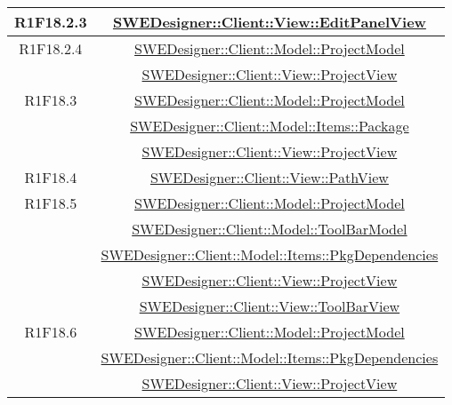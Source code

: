 \documentclass[../DefinizioneDiProdotto.tex]{subfiles}
\begin{document}
\begin{longtable}{|c|c|}
				R1F18.2.3
				& \hyperlink{SWEDesigner::Client::View::EditPanelView}{SWEDesigner::Client::View::EditPanelView}\\
				\hline

				R1F18.2.4
				& \hyperlink{SWEDesigner::Client::Model::ProjectModel}{SWEDesigner::Client::Model::ProjectModel}\\
				& \hyperlink{SWEDesigner::Client::View::ProjectView}{SWEDesigner::Client::View::ProjectView}\\
				\hline

				R1F18.3
				& \hyperlink{SWEDesigner::Client::Model::ProjectModel}{SWEDesigner::Client::Model::ProjectModel}\\
				& \hyperlink{SWEDesigner::Client::Model::Items::Package}{SWEDesigner::Client::Model::Items::Package}\\
				& \hyperlink{SWEDesigner::Client::View::ProjectView}{SWEDesigner::Client::View::ProjectView}\\
				\hline

				R1F18.4
				& \hyperlink{SWEDesigner::Client::View::PathView}{SWEDesigner::Client::View::PathView}\\
				\hline

				R1F18.5
				& \hyperlink{SWEDesigner::Client::Model::ProjectModel}{SWEDesigner::Client::Model::ProjectModel}\\
				& \hyperlink{SWEDesigner::Client::Model::ToolBarModel}{SWEDesigner::Client::Model::ToolBarModel}\\
				& \hyperlink{SWEDesigner::Client::Model::Items::PkgDependencies}{SWEDesigner::Client::Model::Items::PkgDependencies}\\
				& \hyperlink{SWEDesigner::Client::View::ProjectView}{SWEDesigner::Client::View::ProjectView}\\
				& \hyperlink{SWEDesigner::Client::View::ToolBarView}{SWEDesigner::Client::View::ToolBarView}\\
				\hline

				R1F18.6
				& \hyperlink{SWEDesigner::Client::Model::ProjectModel}{SWEDesigner::Client::Model::ProjectModel}\\
				& \hyperlink{SWEDesigner::Client::Model::Items::PkgDependencies}{SWEDesigner::Client::Model::Items::PkgDependencies}\\
				& \hyperlink{SWEDesigner::Client::View::ProjectView}{SWEDesigner::Client::View::ProjectView}\\
				\hline


\end{longtable}
\end{document}
